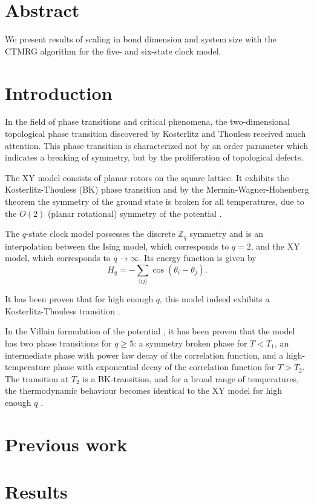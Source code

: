 \section{Abstract}
We present results of scaling in bond dimension and system size with the CTMRG algorithm for the five- and six-state
clock model.

\section{Introduction}
In the field of phase transitions and critical phenomena, the two-dimensional topological phase transition discovered by
Kosterlitz and Thouless \cite{kosterlitz1973ordering, kosterlitz1974critical} received much attention. This phase
transition is characterized not by an order parameter which indicates a breaking of symmetry, but by the proliferation
of topological defects.

The XY model consists of planar rotors on the square lattice. It exhibits the Kosterlitz-Thouless (BK) phase transition
and by the Mermin-Wagner-Hohenberg theorem the symmetry of the ground state is broken for all temperatures, due to
the $O(2)$ (planar rotational) symmetry of the potential \cite{mermin1966absence, hohenberg1967existence}.

The $q$-state clock model possesses the discrete $\mathbb{Z}_q$ symmetry and is an interpolation between the Ising
model, which corresponds to $q = 2$, and the XY model, which corresponds to $q \to \infty$. Its energy function is given
by
\begin{equation}
  H_q = -\sum_{\langle i j \rangle} \cos(\theta_i - \theta_j).
\end{equation}

It has been proven that for high enough $q$, this model indeed exhibits a Kosterlitz-Thouless transition
\cite{frohlich1981kosterlitz}.

In the Villain formulation of the potential \cite{villain1975theory}, it has been proven that the model has two phase
transitions for $q \geq 5$: a symmetry broken phase for $T < T_1$, an intermediate phase with power law decay of the
correlation function, and a high-temperature phase with exponential decay of the correlation function for $T > T_2$. The
transition at $T_2$ is a BK-transition, and for a broad range of temperatures, the thermodynamic behaviour becomes
identical to the XY model for high enough $q$ \cite{lapilli2006universality}.


\section{Previous work}

\section{Results}
